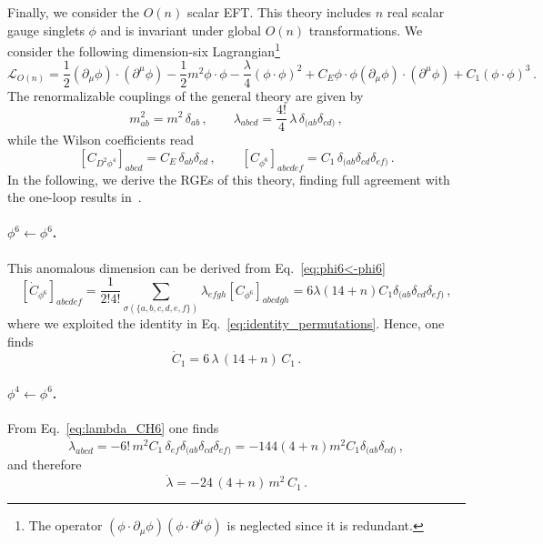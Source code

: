 Finally, we consider the $O(n)$ scalar EFT. 
This theory includes $n$ real scalar gauge singlets $\phi$ and is invariant under global $O(n)$ transformations.
We consider the following dimension-six Lagrangian\footnote{The operator $(\phi \cdot \partial_\mu \phi)(\phi \cdot \partial^\mu \phi)$ is neglected since it is redundant.}
\begin{equation}
    \mathcal L_{O(n)} = \frac{1}{2}(\partial_\mu \phi)\cdot (\partial^\mu \phi) - \frac{1}{2}m^2 \phi \cdot \phi - \frac{\lambda}{4}(\phi \cdot \phi)^2 + C_{E}\phi\cdot \phi (\partial_\mu \phi)\cdot (\partial^\mu \phi) + C_1 (\phi\cdot \phi)^3\,.
\end{equation}
The renormalizable couplings of the general theory are given by
\begin{equation}
    m^2_{ab} = m^2 \,\delta_{ab}\,, \qquad 
    \lambda_{abcd} = \frac{4!}{4}\,\lambda \,\delta_{(ab}\delta_{cd)}\,,
\end{equation}
while the Wilson coefficients read
\begin{equation}
    \left[C_{D^2\phi^4}\right]_{abcd} = C_E\, \delta_{ab}\delta_{cd}\,,
    \qquad
    \left[C_{\phi^6}\right]_{abcdef} = C_1 \,\delta_{(ab}\delta_{cd}\delta_{ef)}\,.
\end{equation}
In the following, we derive the RGEs of this theory, finding full agreement with the one-loop results in~\cite{Jenkins:2023bls,Cao:2021cdt}.

\paragraph{\texorpdfstring{$\phi^6 \leftarrow \phi^6$}{phi6fromphi6}.}
This anomalous dimension can be derived from Eq.~\eqref{eq:phi6<-phi6}
\begin{equation}
    \left[\dot C_{\phi^6}\right]_{abcdef} = 
    \frac{1}{2!4!}\sum_{\sigma(\{a,b,c,d,e,f\})}\lambda_{efgh} \left[C_{\phi^6}\right]_{abcdgh} = 6 \lambda  (14+n) C_1 \delta_{(ab}\delta_{cd}\delta_{ef)}\,,
\end{equation}
where we exploited the identity in Eq.~\eqref{eq:identity_permutations}.
Hence, one finds
\begin{equation}
    \dot C_1 = 6\, \lambda\,  (14+n)\, C_1\,.
\end{equation}

\paragraph{\texorpdfstring{$\phi^4 \leftarrow \phi^6$}{phi4fromphi6}.}
From Eq.~\eqref{eq:lambda_CH6} one finds
\begin{equation}
    \dot \lambda_{abcd} = -6!\,m^2 C_1\, \delta_{ef} \delta_{(ab}\delta_{cd}\delta_{ef)} = -144 (4+n)m^2 C_1 \delta_{(ab}\delta_{cd)}\,,
\end{equation}
and therefore
\begin{equation}
    \dot \lambda = -24\, (4+n)\,m^2\, C_1 \,.
\end{equation}

